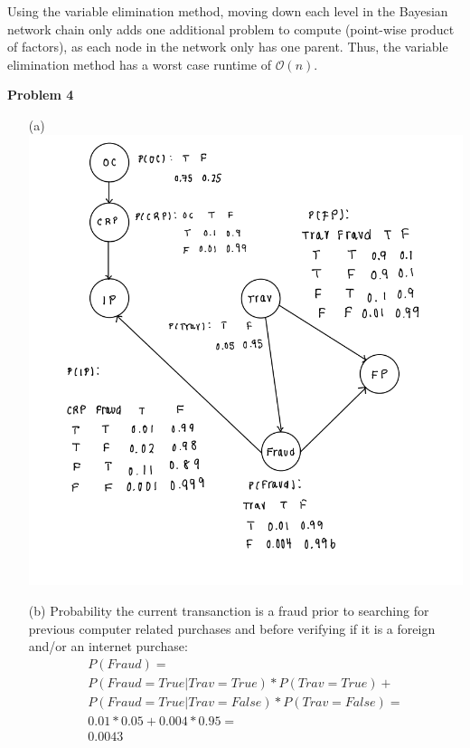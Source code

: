 \documentclass[11pt]{article}
\begin{document}
\begin{enumerate}
        Using the variable elimination method, moving down each level in the Bayesian network
        chain only adds one additional problem to compute (point-wise product of factors), as each node in the
        network only has one parent.
        Thus, the variable elimination method has a worst case
        runtime of $\mathcal{O}(n)$.
    \end{enumerate}

    \begin{center}
        \Large
        \textbf{Problem 4}
    \end{center}
    \normalsize
    \begin{enumerate}
        \item[(a)]
        \includegraphics[width=\linewidth]{images/bayesnetwork.PNG} \\
        \item[(b)]
        Probability the current transanction is a fraud prior to searching for previous computer related purchases and before verifying if it is a foreign and/or an internet purchase:\\
        \begin{gather*}
        P(Fraud) = \\P(Fraud = True| Trav = True) * P(Trav = True) + \\P(Fraud = True| Trav = False) * P(Trav = False) =\\ 0.01 * 0.05 + 0.004 * 0.95 = \\0.0043\\
        \end{gather*}
        \\
        

\end{enumerate}
\end{document}
